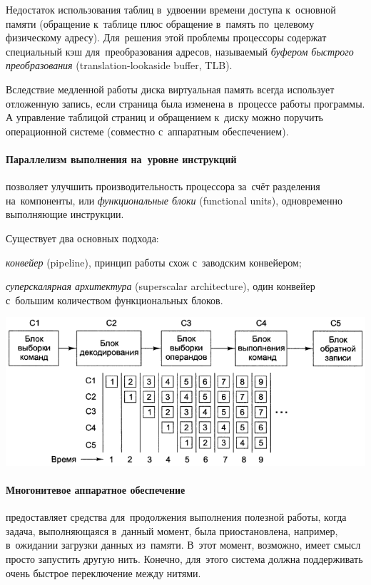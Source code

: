 Недостаток использования таблиц в~удвоении времени доступа к~основной памяти (обращение к~таблице плюс обращение в~память по~целевому физическому адресу). Для~решения этой проблемы процессоры содержат специальный кэш для~преобразования адресов, называемый \emph{буфером быстрого преобразования} (\textenglish{translation-lookaside buffer, TLB}).

Вследствие медленной работы диска виртуальная память всегда использует отложенную запись, если страница была изменена в~процессе работы программы. А управление таблицой страниц и обращением к~диску можно поручить операционной системе (совместно с~аппаратным обеспечением).



\paragraph{Параллелизм выполнения на~уровне инструкций}
позволяет улучшить производительность процессора за~счёт разделения на~компоненты, или \emph{функциональные блоки} (\textenglish{functional units}), одновременно выполняющие инструкции.

Существует два основных подхода:
\begin{itemfeature}
  \item \emph{конвейер} (\textenglish{pipeline}), принцип работы схож с~заводским конвейером;
  \item \emph{суперскалярная архитектура} (\textenglish{superscalar architecture}), один конвейер с~большим количеством функциональных блоков.
\end{itemfeature}

\begin{center}
  \includegraphics[width=0.7\columnwidth]{images/pipeline.png}
\end{center}



\paragraph{Многонитевое аппаратное обеспечение}
предоставляет средства для~продолжения выполнения полезной работы, когда задача, выполняющаяся в~данный момент, была приостановлена, например, в~ожидании загрузки данных из~памяти. В~этот момент, возможно, имеет смысл просто запустить другую нить. Конечно, для~этого система должна поддерживать очень быстрое переключение между нитями.




